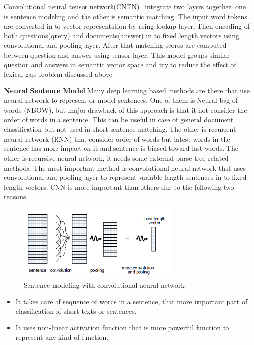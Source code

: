 \documentclass{doublecol-new}
\theoremstyle{TH}{
\newtheorem{lemma}{Lemma}
\newtheorem{theorem}[lemma]{Theorem}
\newtheorem{corrolary}[lemma]{Corrolary}
\newtheorem{conjecture}[lemma]{Conjecture}
\newtheorem{proposition}[lemma]{Proposition}
\newtheorem{claim}[lemma]{Claim}
\newtheorem{stheorem}[lemma]{Wrong Theorem}
\newtheorem{algorithm}{Algorithm}
}
\theoremstyle{THrm}{
\newtheorem{definition}{Definition}[section]
\newtheorem{question}{Question}[section]
\newtheorem{remark}{Remark}
\newtheorem{scheme}{Scheme}
}
\theoremstyle{THhit}{
\newtheorem{case}{Case}[section]
}
\begin{document}
Convolutional neural tensor network(CNTN)~\cite{qiu2015convolutional} integrate two layers together. one is sentence modeling and the other is semantic matching. The input word tokens are converted in to vector representation by using lookup layer. Then encoding of both questions(query) and documents(answer) in to fixed length vectors using convolutional and pooling layer. After that matching scores are computed between question and answer using tensor layer. This model groups similar question and answers in semantic vector space and try to reduce the effect of lexical gap problem discussed above. 

\textbf{Neural Sentence Model} Many deep learning based methods are there that use neural network to represent or model sentences. One of them is Neural bag of words (NBOW), but major drawback of this approach is that it not consider the order of words in a sentence. This can be useful in case of general document classification but not used in short sentence matching. The other is recurrent neural network (RNN) that consider order of words but latest words in the sentence has more impact on it and sentence is biased toward last words. The other is recursive neural network, it needs some external parse tree related methods. The most important method is convolutional neural network  that uses convolutional and pooling layer to represent variable length sentences in to fixed length vectors. CNN is more important than others due to the following two reasons. 


\begin{figure}[h]
	\centerline{\includegraphics[width=8cm,keepaspectratio]{image/sentencemodeling.PNG}}
	\label{Sentence modelling with convolutional neural network}
	\caption{Sentence modeling with convolutional neural network}
\end{figure} 


\begin{itemize}
	\item It takes care of sequence of words in a sentence, that more important part of classification of short texts or sentences.
	\item  It uses non-linear activation function that is more powerful function to represent any kind of function. 
	
\end{itemize}
\end{document}
